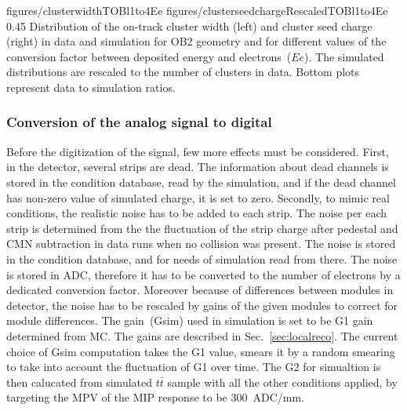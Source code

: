                  {figures/clusterwidthTOBl1to4Ee}
                 {figures/clusterseedchargeRescaledTOBl1to4Ee} %
                 {0.45}       %
                 { Distribution of the on-track cluster width (left) and cluster seed charge (right) in data and simulation for OB2 geometry and for different values of the conversion factor between deposited energy and electrons~($Ee$).  The simulated distributions are rescaled to the number of clusters in data.  Bottom plots represent data to simulation ratios. }


\subsubsection{Conversion of the analog signal to digital~\label{sec:digitize}}

Before the digitization of the signal, few more effects must be considered. First, in the detector, several strips are dead. The information about dead channels is stored in the condition database, read by the simulation, and if the dead channel has non-zero value of simulated charge, it is set to zero. Secondly, to mimic real conditions, the realistic noise has to be added to each strip. The noise per each strip is determined from the the fluctuation of the strip charge after pedestal and CMN subtraction in data runs when no collision was present. The noise is stored in the condition database, and for needs of simulation read from there. The noise is stored in ADC, therefore it has to be converted to the number of electrons by a dedicated conversion factor. Moreover because of differences between modules in detector, the noise has to be rescaled by gains of the given modules to correct for module differences. The gain~(Gsim) used in simulation is set to be G1 gain determined from MC. The gains are described in Sec.~\ref{sec:localreco}. The current choice of Gsim computation takes the G1 value, smears it by a random smearing to take into account the fluctuation of G1 over time. The G2 for simualtion is then calucated from simulated $t\bar{t}$ sample with all the other conditions applied, by targeting the MPV of the MIP response to be 300~ADC/mm.

